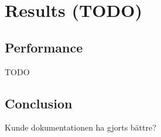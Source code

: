 \section{Results (TODO)}

\subsection{Performance}

TODO

\subsection{Conclusion}
Kunde dokumentationen ha gjorts bättre?


